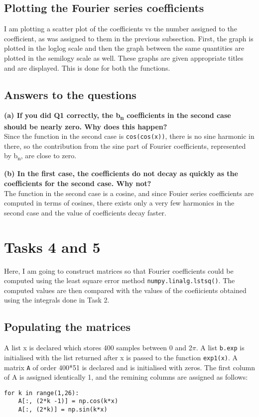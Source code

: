 \documentclass[11pt, a4paper]{article}
\begin{document}
\subsection{Plotting the Fourier series coefficients}
I am plotting a scatter plot of the coefficients vs the number assigned to the coefficient, as was assigned to them in the previous subsection. First, the graph is plotted in the loglog scale and then the graph between the same quantities are plotted in the semilogy scale as well. These graphs are given appropriate titles and are displayed. This is done for both the functions.

\subsection{Answers to the questions}
\textbf{(a) If you did Q1 correctly, the b\textsubscript{n} coefficients in the second case should be nearly zero. Why does this happen?}
\\Since the function in the second case is \texttt{cos(cos(x))}, there is no sine harmonic in there, so the contribution from the sine part of Fourier coefficients, represented by b\textsubscript{n}, are close to zero.

\textbf{(b) In the first case, the coefficients do not decay as quickly as the coefficients for the second case. Why not?}
\\The function in the second case is a cosine, and since Fouier series coefficients are computed in terms of cosines, there exists only a very few harmonics in the second case and the value of coefficients decay faster. 

\section{Tasks 4 and 5}
Here, I am going to construct matrices so that Fourier coefficients could be computed using the least square error method \texttt{numpy.linalg.lstsq()}. The computed values are then compared with the values of the coefiicients obtained using the integrals done in Task 2.

\subsection{Populating the matrices}
A list x is declared which stores 400 samples between 0 and  2$\pi$. A list \texttt{b.exp} is initialised with the list returned after x is passed to the function \texttt{exp1(x)}. A matrix \texttt{A} of order 400*51 is declared and is initialised with zeros. The first column of A is assigned identically 1, and the remining columns are assigned as follows:
\begin{verbatim}
for k in range(1,26):
    A[:, (2*k -1)] = np.cos(k*x)
    A[:, (2*k)] = np.sin(k*x)
\end{verbatim}
\end{document}
